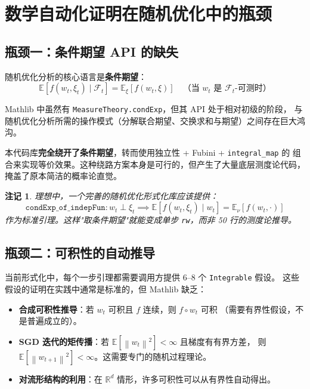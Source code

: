 \documentclass[12pt, a4paper]{article}
\newtheorem{remark}[theorem]{注记}
\newcommand{\E}{\mathbb{E}}
\newcommand{\R}{\mathbb{R}}
\newcommand{\norm}[1]{\left\| #1 \right\|}
\newcommand{\lean}[1]{\texttt{#1}}
\begin{document}
\section{数学自动化证明在随机优化中的瓶颈}

\subsection{瓶颈一：条件期望 API 的缺失}

随机优化分析的核心语言是\textbf{条件期望}：
\[
  \E[f(w_t, \xi_t) \mid \mathcal{F}_t] = \E_\xi[f(w_t, \xi)] \quad \text{（当 $w_t$ 是 $\mathcal{F}_t$-可测时）}
\]

Mathlib 中虽然有 \lean{MeasureTheory.condExp}，但其 API 处于相对初级的阶段，
与随机优化分析所需的操作模式（分解联合期望、交换求和与期望）之间存在巨大鸿沟。

本代码库\textbf{完全绕开了条件期望}，转而使用独立性 + Fubini + \lean{integral\_map} 的
组合来实现等价效果。这种绕路方案本身是可行的，但产生了大量底层测度论代码，
掩盖了原本简洁的概率论直觉。

\begin{remark}
理想中，一个完善的随机优化形式化库应该提供：
\[
  \lean{condExp\_of\_indepFun} : w_t \perp \xi_t \implies 
  \E[f(w_t, \xi_t) \mid w_t] = \E_\nu[f(w_t, \cdot)]
\]
作为标准引理。这样"取条件期望"就能变成单步 \lean{rw}，而非 50 行的测度论推导。
\end{remark}

\subsection{瓶颈二：可积性的自动推导}

当前形式化中，每个一步引理都需要调用方提供 6--8 个 \lean{Integrable} 假设。
这些假设的证明在实践中通常是标准的，但 Mathlib 缺乏：

\begin{itemize}
  \item \textbf{合成可积性推导}：若 $w_t$ 可积且 $f$ 连续，则 $f \circ w_t$ 可积
        （需要有界性假设，不是普遍成立的）。
  \item \textbf{SGD 迭代的矩传播}：若 $\E[\norm{w_t}^2] < \infty$ 且梯度有有界方差，
        则 $\E[\norm{w_{t+1}}^2] < \infty$。这需要专门的随机过程理论。
  \item \textbf{对流形结构的利用}：在 $\R^d$ 情形，许多可积性可以从有界性自动得出。
\end{itemize}
\end{document}
